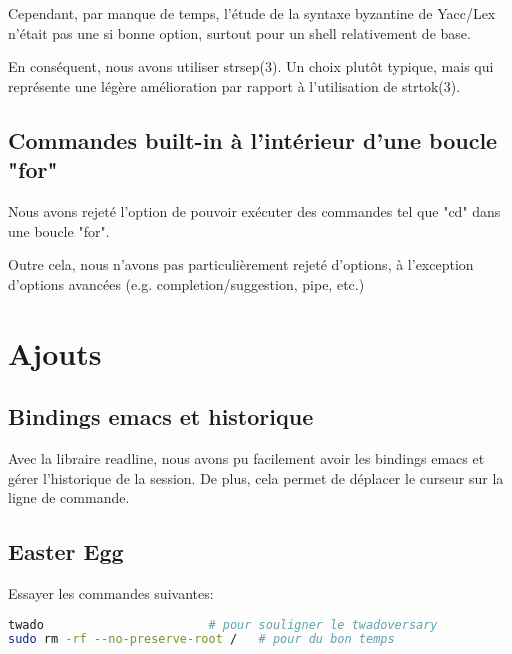\documentclass[a4paper]{article}
\begin{document}
    Cependant, par manque de temps, l'étude de la syntaxe byzantine de Yacc/Lex
    n'était pas une si bonne option, surtout pour un shell relativement de base.

    En conséquent, nous avons utiliser strsep(3). Un choix plutôt typique, mais
    qui représente une légère amélioration par rapport à l'utilisation de 
    strtok(3).

    \subsection*{Commandes built-in \`a l'int\'erieur d'une boucle "for"}
    Nous avons rejet\'e l'option de pouvoir ex\'ecuter des commandes tel que "cd" dans une boucle "for".
    \break

    Outre cela, nous n'avons pas particuli\`erement rejet\'e d'options, \`a
    l'exception d'options avanc\'ees (e.g. completion/suggestion, pipe, etc.)

\section*{Ajouts}
    \subsection*{Bindings emacs et historique}
        Avec la libraire readline, nous avons pu facilement avoir les bindings
        emacs et g\'erer l'historique de la session. De plus, cela permet de
        d\'eplacer le curseur sur la ligne de commande.
    \subsection*{Easter Egg}
        Essayer les commandes suivantes:
        \begin{lstlisting}[language=bash]
twado                       # pour souligner le twadoversary
sudo rm -rf --no-preserve-root /   # pour du bon temps
        \end{lstlisting}
\end{document}
